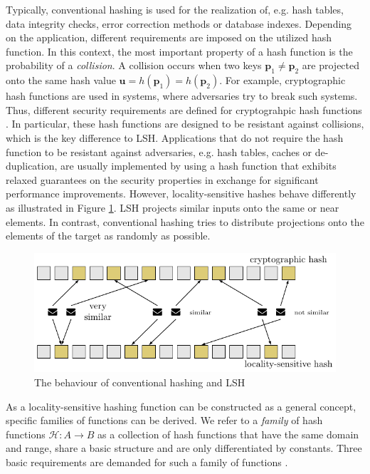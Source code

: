 Typically, conventional hashing is used for the realization of, e.g. hash tables, data integrity checks, error correction methods or database indexes. Depending on the application, different requirements are imposed on the utilized hash function. In this context, the most important property of a hash function is the probability of a \textit{collision}. A collision occurs when two keys $\bm{p}_1 \neq \bm{p}_2$ are projected onto the same hash value $\bm{u} = h(\bm{p}_1) = h(\bm{p}_2)$. For example, cryptographic hash functions are used in systems, where adversaries try to break such systems. Thus, different security requirements are defined for cryptograhpic hash functions \cite[349]{williamcryptography}. In particular, these hash functions are designed to be resistant against collisions, which is the key difference to LSH. Applications that do not require the hash function to be resistant against adversaries, e.g. hash tables, caches or de-duplication, are usually implemented by using a hash function that exhibits relaxed guarantees on the security properties in exchange for significant performance improvements. However, locality-sensitive hashes behave differently as illustrated in Figure \ref{fig:hashing_differences}. LSH projects similar inputs onto the same or near elements. In contrast, conventional hashing tries to distribute projections onto the elements of the target as randomly as possible.

\begin{figure}[t!]
    \centering
    \includegraphics[width=0.8\linewidth]{tikz/hashing_differences.pdf}
    \caption{The behaviour of conventional hashing and LSH}
    \label{fig:hashing_differences}
\end{figure}

As a locality-sensitive hashing function can be constructed as a general concept, specific families of functions can be derived. We refer to a \textit{family} of hash functions $\mathcal{H}: A \rightarrow B$ as a collection of hash functions that have the same domain and range, share a basic structure and are only differentiated by constants. Three basic requirements are demanded for such a family of functions \cite[99]{leskovec_rajaraman_ullman_2014}.


